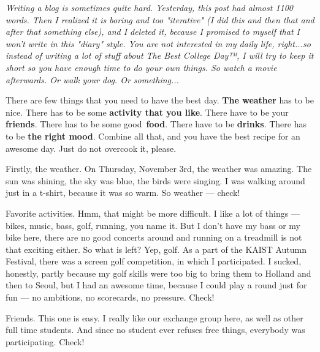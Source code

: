 \begin{post}
	\begin{content}
\textit{Writing a blog is sometimes quite hard. Yesterday, this post had almost 1100 words. Then I realized it is boring and too "iterative" (I did this and then that and after that something else), and I deleted it, because I promised to myself that I won't write in this "diary" style. You are not interested in my daily life, right...so instead of writing a lot of stuff about The Best College Day™, I will try to keep it short so you have enough time to do your own things. So watch a movie afterwards. Or walk your dog. Or something...}

There are few things that you need to have the best day. \textbf{The weather} has to be nice. There has to be some \textbf{activity that you like}. There have to be your \textbf{friends}. There has to be some good \textbf{food}. There have to be \textbf{drinks}. There has to be\textbf{ the right mood}. Combine all that, and you have the best recipe for an awesome day. Just do not overcook it, please.

Firstly, the weather. On Thursday, November 3rd, the weather was amazing. The sun was shining, the sky was blue, the birds were singing. I was walking around just in a t-shirt, because it was so warm. So weather — \textcolor{Chameleon}{check!}

Favorite activities. Hmm, that might be more difficult. I like a lot of things — bikes, music, bass, golf, running, you name it. But I don't have my bass or my bike here, there are no good concerts around and running on a treadmill is not that exciting either. So what is left? Yep, golf. As a part of the KAIST Autumn Festival, there was a screen golf competition, in which I participated. I sucked, honestly, partly because my golf skills were too big to bring them to Holland and then to Seoul, but I had an awesome time, because I could play a round just for fun — no ambitions, no scorecards, no pressure. \textcolor{Chameleon}{Check!}

Friends. This one is easy. I really like our exchange group here, as well as other full time students. And since no student ever refuses free things, everybody was participating. \textcolor{Chameleon}{Check!}

\begin{figure}
\centering{}\vspace{-32pt}
\end{figure}



\end{content}
\end{post}

